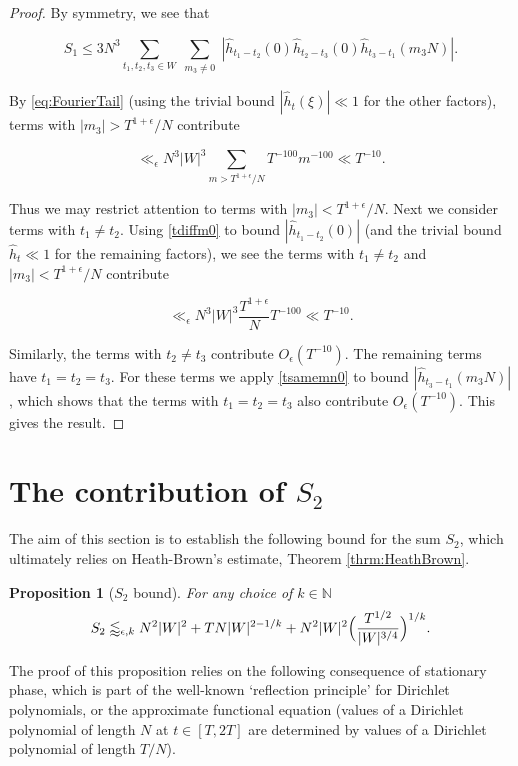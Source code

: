 \documentclass{amsart}
\theoremstyle{plain}
\newtheorem{prpstn}[thrm]{Proposition}
\numberwithin{equation}{section}
\begin{document}
\begin{proof}
  By symmetry, we see that
  
\[
S_1\le 3N^3\sum_{t_1,t_2,t_3\in W}\sum_{\substack{m_3 \not= 0}} |\widehat{h}_{t_1 - t_2}(0) \widehat{h}_{t_2 - t_3}(0) \widehat{h}_{t_3 - t_1}(m_3 N)|.
 \]
 
 By \eqref{eq:FourierTail} (using the trivial bound $|\widehat{h}_t(\xi)|\ll 1$ for the other factors), terms with $|m_3|>T^{1+\epsilon}/N$ contribute
 
 \[
 \ll_\epsilon N^3|W|^3\sum_{m>T^{1+\epsilon}/N}T^{-100}m^{-100}\ll  T^{-10}.
 \]
 
 Thus we may restrict attention to terms with $|m_3|<T^{1+\epsilon}/N$. Next we consider terms with $t_1\ne t_2$. Using \eqref{tdiffm0} to bound $|\widehat{h}_{t_1 - t_2}(0)|$ (and the trivial bound $\widehat{h}_t\ll 1$ for the remaining  factors), we see the terms with $t_1\ne t_2$ and $|m_3|<T^{1+\epsilon}/N$ contribute
 
 \[
 \ll_\epsilon N^3|W|^3\frac{T^{1+\epsilon}}{N}T^{-100}\ll  T^{-10}.
 \]
 
 Similarly, the terms with $t_2\ne t_3$ contribute $O_\epsilon(T^{-10})$. The remaining terms have $t_1 = t_2 = t_3$. For these terms we apply \eqref{tsamemn0} to bound $|\widehat{h}_{t_3 - t_1}(m_3 N)|$, which shows that the terms with $t_1=t_2=t_3$ also contribute $O_\epsilon(T^{-10})$. This gives the result.
\end{proof}

%
%
%
%


\section{The contribution of \texorpdfstring{$S_2$}{S2}}

The aim of this section is to establish the following bound for the sum $S_2$, which ultimately relies on Heath-Brown's estimate, Theorem \ref{thrm:HeathBrown}.

%
%


\begin{prpstn}[$S_2$ bound]\label{prpstn:S2}
For any choice of $k\in \mathbb{N}$
\[
S_{2}\lessapprox_{\epsilon,k} N^2 |W|^2+TN|W|^{2-1/k}+N^2|W|^2 \Bigl(\frac{T^{1/2}}{|W|^{3/4}}\Bigr)^{1/k}.
\]
\end{prpstn}

The proof of this proposition relies on the following consequence of stationary phase, which is part of the well-known  `reflection principle' for Dirichlet polynomials, or the approximate functional equation (values of a Dirichlet polynomial of length $N$ at $t\in [T,2T]$ are determined by values of a Dirichlet polynomial of length $T/N$).
\end{document}
